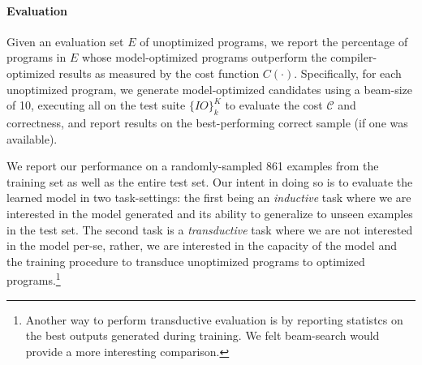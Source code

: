 \documentclass{article}
\begin{document}

\paragraph{Evaluation}
Given an evaluation set $E$ of unoptimized programs, we report the percentage of programs in $E$ whose model-optimized programs outperform the compiler-optimized results as measured by the cost function $C(\cdot)$.
Specifically, for each unoptimized program, we generate model-optimized candidates using a beam-size of 10, executing all on the test suite $\{IO\}_{k}^K$ to evaluate the cost $\mathcal{C}$ and correctness, and report results on the best-performing correct sample (if one was available). 

We report our performance on a randomly-sampled 861 examples from the training set as well as the entire test set. Our intent in doing so is to evaluate the learned model in two task-settings: the first being an \textit{inductive} task where we are interested in the model generated and its ability to generalize to unseen examples in the test set. The second task is a \textit{transductive} task where we are not interested in the model per-se, rather, we are interested in the capacity of the model and the training procedure to transduce unoptimized programs to optimized programs.\footnote{Another way to perform transductive evaluation is by reporting statistcs on the best outputs generated during training. We felt beam-search would provide a more interesting comparison.}

\end{document}

